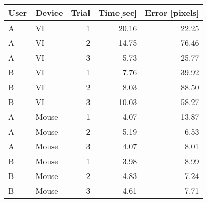 \begin{tabular}{llrrr}
 \toprule
 User & Device & Trial & Time[sec] & Error [pixels] \\
 \midrule
 A	& VI	  & 1	& 20.16	& 22.25 \\
 A	& VI	  & 2	& 14.75	& 76.46 \\
 A	& VI	  & 3	& 5.73	& 25.77 \\
 B	& VI	  & 1	& 7.76	& 39.92 \\
 B	& VI	  & 2	& 8.03	& 88.50 \\
 B	& VI	  & 3	& 10.03	& 58.27 \\
 A	& Mouse	& 1	& 4.07	& 13.87 \\
 A	& Mouse	& 2	& 5.19	& 6.53 \\
 A	& Mouse	& 3	& 4.07	& 8.01 \\
 B	& Mouse	& 1	& 3.98	& 8.99 \\
 B	& Mouse	& 2	& 4.83	& 7.24 \\
 B	& Mouse	& 3	& 4.61	& 7.71 \\
 \bottomrule
\end{tabular}
